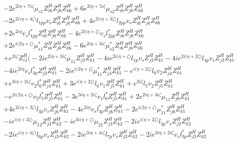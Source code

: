 \begin{align}
 &-2 e^{2 i \eta +7 i \zeta } \mu_{s1} Z_{{i 6}}^{H} Z_{{j 6}}^{H} Z_{{k 6}}^{H} +6 e^{2 i \eta +5 i \zeta } \mu_{s2} Z_{{i 6}}^{H} Z_{{j 6}}^{H} Z_{{k 6}}^{H} \nonumber \\ 
 &-2 e^{2 i \Big(\eta +4 \zeta \Big)} l_{1pp} v_s Z_{{i 6}}^{H} Z_{{j 6}}^{H} Z_{{k 6}}^{H} +4 e^{2 i \Big(\eta +3 \zeta \Big)} l_{2pp} v_s Z_{{i 6}}^{H} Z_{{j 6}}^{H} Z_{{k 6}}^{H} \nonumber \\ 
 &+2 e^{2 i \eta } v_s l_{1pp}^* Z_{{i 6}}^{H} Z_{{j 6}}^{H} Z_{{k 6}}^{H} -4 e^{2 i \Big(\eta +\zeta \Big)} v_s l_{2pp}^* Z_{{i 6}}^{H} Z_{{j 6}}^{H} Z_{{k 6}}^{H} \nonumber \\ 
 &+2 e^{i \Big(2 \eta +\zeta \Big)} \mu_{s1}^* Z_{{i 6}}^{H} Z_{{j 6}}^{H} Z_{{k 6}}^{H} -6 e^{2 i \eta +3 i \zeta } \mu_{s2}^* Z_{{i 6}}^{H} Z_{{j 6}}^{H} Z_{{k 6}}^{H} \nonumber \\ 
 &+e^{2 i \zeta } Z_{{i 1}}^{H} \Big(-2 i e^{2 i \eta +3 i \zeta } \mu_{11} Z_{{j 3}}^{H} Z_{{k 1}}^{H} -4 i e^{2 i \Big(\eta +\zeta \Big)} l_{1p} v_s Z_{{j 3}}^{H} Z_{{k 1}}^{H} -4 i e^{2 i \Big(\eta +2 \zeta \Big)} l_{4p} v_s Z_{{j 3}}^{H} Z_{{k 1}}^{H} \nonumber \\ 
 &-4 i e^{2 i \eta } v_s l_{4p}^* Z_{{j 3}}^{H} Z_{{k 1}}^{H} -2 i e^{i \Big(2 \eta +\zeta \Big)} \mu_{11}^* Z_{{j 3}}^{H} Z_{{k 1}}^{H} - e^{i \Big(\eta +2 \zeta \Big)} l_6 v_2 Z_{{j 4}}^{H} Z_{{k 1}}^{H} \nonumber \\ 
 &+e^{3 i \eta +2 i \zeta } v_2 l_6^* Z_{{j 4}}^{H} Z_{{k 1}}^{H} +3 e^{i \Big(\eta +2 \zeta \Big)} l_6 v_1 Z_{{j 5}}^{H} Z_{{k 1}}^{H} +e^{2 i \zeta } l_5 v_2 Z_{{j 5}}^{H} Z_{{k 1}}^{H} \nonumber \\ 
 &- e^{2 i \Big(2 \eta +\zeta \Big)} v_2 l_5^* Z_{{j 5}}^{H} Z_{{k 1}}^{H} -3 e^{3 i \eta +2 i \zeta } v_1 l_6^* Z_{{j 5}}^{H} Z_{{k 1}}^{H} +2 e^{2 i \eta +3 i \zeta } \mu_{11} Z_{{j 6}}^{H} Z_{{k 1}}^{H} \nonumber \\ 
 &+4 e^{2 i \Big(\eta +2 \zeta \Big)} l_{4p} v_s Z_{{j 6}}^{H} Z_{{k 1}}^{H} -4 e^{2 i \eta } v_s l_{4p}^* Z_{{j 6}}^{H} Z_{{k 1}}^{H} -2 e^{i \Big(2 \eta +\zeta \Big)} \mu_{11}^* Z_{{j 6}}^{H} Z_{{k 1}}^{H} \nonumber \\ 
 &-i e^{i \Big(\eta +3 \zeta \Big)} \mu_{12} Z_{{j 3}}^{H} Z_{{k 2}}^{H} -i e^{3 i \Big(\eta +\zeta \Big)} \mu_{21} Z_{{j 3}}^{H} Z_{{k 2}}^{H} -2 i e^{i \Big(\eta +2 \zeta \Big)} l_{3p} v_s Z_{{j 3}}^{H} Z_{{k 2}}^{H} \nonumber \\ 
 &-2 i e^{i \Big(\eta +4 \zeta \Big)} l_{6p} v_s Z_{{j 3}}^{H} Z_{{k 2}}^{H} -2 i e^{3 i \eta +4 i \zeta } l_{7p} v_s Z_{{j 3}}^{H} Z_{{k 2}}^{H} -2 i e^{3 i \eta +2 i \zeta } v_s l_{3p}^* Z_{{j 3}}^{H} Z_{{k 2}}^{H} \nonumber \\ 

\end{align}
